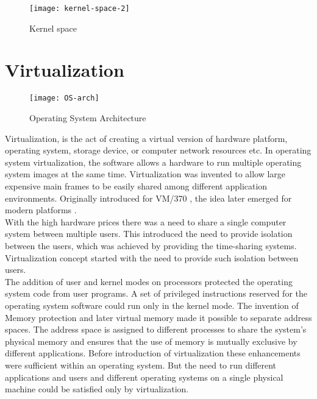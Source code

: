 \begin{figure}[!ht]
\centering
\texttt{[image: kernel-space-2]}
\caption{Kernel space}
\label{fig:Kernel space3}
\end{figure}


\clearpage
\section{Virtualization}

\begin{figure}[!ht]
\centering
\texttt{[image: OS-arch]}
\caption{Operating System Architecture}
\label{fig:OS}
\end{figure}

Virtualization, is the act of creating a virtual version of hardware platform, operating system, storage device, or computer network resources etc. In operating system virtualization, the software allows a hardware to run multiple operating system images at the same time. Virtualization was invented to allow large expensive main frames to be easily shared among different application environments.\cite{Menascé05virtualization:concepts} Originally introduced for VM/370 \cite{Creasy:1981:OVT:1664853.1664863}, the idea later emerged for modern platforms \cite{Bugnion:1997:DRC:265924.265930, Rosenblum:2004:RVM:1016998.1017000}. 
\\
With the high hardware prices there was a need to share a single computer system between multiple users. This introduced the need to provide isolation between the users, which was achieved by providing the time-sharing systems. Virtualization concept started with the need to provide such isolation between users. 
\\
The addition of user and kernel modes on processors protected the operating system code from user programs. A set of privileged instructions reserved for the operating system software could run only in the kernel mode. The invention of Memory protection and later virtual memory made it possible to separate address spaces. The address space is assigned to different processes to share the system's physical memory and ensures that the use of memory is mutually exclusive by different applications. Before introduction of virtualization these enhancements were sufficient within an operating system. But the need to run different applications and users and different operating systems on a single physical machine could be satisfied only by virtualization.\cite{Crosby:2006:VR:1189276.1189289}
\\
